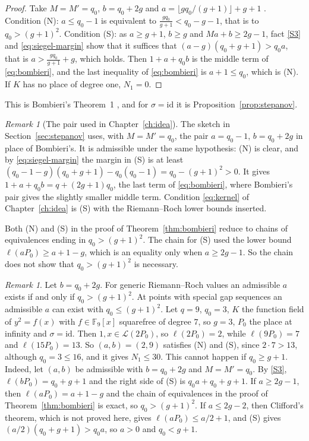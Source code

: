 \documentclass[11pt]{amsbook}
\theoremstyle{plain}
\theoremstyle{definition}
\theoremstyle{remark}
\newtheorem{remark}[theorem]{Remark}
\numberwithin{equation}{section}
\numberwithin{figure}{chapter}
\numberwithin{table}{chapter}
\newcommand{\F}{\mathbb{F}}
\newcommand{\calL}{\mathcal{L}}
\begin{document}
\begin{proof}
Take $M=M'=q_0$, $b=q_0+2g$ and
$a=\lfloor gq_0/(g+1)\rfloor+g+1$ \cite[p.~239]{Bombieri1974}.
Condition (N): $a\le q_0-1$ is equivalent to
$\frac{gq_0}{g+1}<q_0-g-1$, that is to $q_0>(g+1)^2$. Condition
(S): as $a\ge g+1$, $b\ge g$ and $Ma+b\ge2g-1$, fact \ref{S3} and
\eqref{eq:siegel-margin} show that it suffices that
$(a-g)(q_0+g+1)>q_0a$, that is $a>\frac{gq_0}{g+1}+g$, which holds.
Then $1+a+q_0b$ is the middle term of \eqref{eq:bombieri}, and the
last inequality of \eqref{eq:bombieri} is $a+1\le q_0$, which is
(N). If $K$ has no place of degree one, $N_1=0$.
\end{proof}

This is Bombieri's Theorem~1 \cite[p.~236]{Bombieri1974}, and for
$\sigma=\mathrm{id}$ it is Proposition~\ref{prop:stepanov}.

\begin{remark}[The pair used in Chapter~\ref{ch:idea}]
\label{rem:idea-pair}
The sketch in Section~\ref{sec:stepanov} uses, with $M=M'=q_0$, the
pair $a=q_0-1$, $b=q_0+2g$ in place of Bombieri's. It is admissible
under the same hypothesis: (N) is clear, and by
\eqref{eq:siegel-margin} the margin in (S) is at least
$(q_0-1-g)(q_0+g+1)-q_0(q_0-1)=q_0-(g+1)^2>0$. It gives
$1+a+q_0b=q+(2g+1)q_0$, the last term of \eqref{eq:bombieri}, where
Bombieri's pair gives the slightly smaller middle term. Condition
\eqref{eq:kernel} of Chapter~\ref{ch:idea} is (S) with the
Riemann--Roch lower bounds inserted.
\end{remark}

Both (N) and (S) in the proof of Theorem~\ref{thm:bombieri} reduce
to chains of equivalences ending in $q_0>(g+1)^2$. The chain for
(S) used the lower bound $\ell(aP_0)\ge a+1-g$, which is an
equality only when $a\ge2g-1$. So the chain does not show that
$q_0>(g+1)^2$ is necessary.

\begin{remark}\label{rem:special-admissible}
Let $b=q_0+2g$. For generic Riemann--Roch values an admissible $a$
exists if and only if $q_0>(g+1)^2$. At points with special gap
sequences an admissible $a$ can exist with $q_0\le(g+1)^2$. Let
$q=9$, $q_0=3$, $K$ the function field of
$y^2=f(x)$ with $f\in\F_9[x]$ squarefree of degree $7$, so $g=3$,
$P_0$ the place at infinity and $\sigma=\mathrm{id}$. Then
$1,x\in\calL(2P_0)$, so $\ell(2P_0)=2$, while $\ell(9P_0)=7$ and
$\ell(15P_0)=13$. So $(a,b)=(2,9)$ satisfies (N) and (S), since
$2\cdot7>13$, although $q_0=3\le16$, and it gives $N_1\le30$. This
cannot happen if $q_0\ge g+1$. Indeed, let $(a,b)$ be admissible
with $b=q_0+2g$ and $M=M'=q_0$. By \ref{S3},
$\ell(bP_0)=q_0+g+1$ and the right side of (S) is
$q_0a+q_0+g+1$. If $a\ge2g-1$, then $\ell(aP_0)=a+1-g$ and the
chain of equivalences in the proof of Theorem~\ref{thm:bombieri} is
exact, so $q_0>(g+1)^2$. If $a\le2g-2$, then Clifford's theorem,
which is not proved here, gives $\ell(aP_0)\le a/2+1$, and (S)
gives $(a/2)(q_0+g+1)>q_0a$, so $a>0$ and $q_0<g+1$.
\end{remark}
\end{document}
